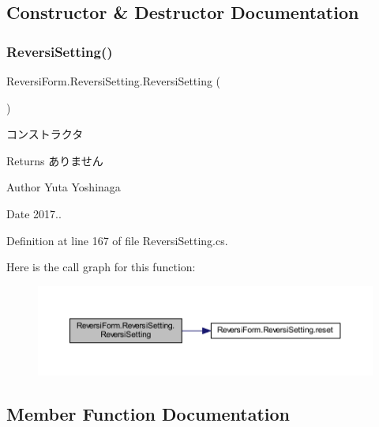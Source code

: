 \subsection{Constructor \& Destructor Documentation}
\mbox{\label{class_reversi_form_1_1_reversi_setting_a985e02a2cbf355f46474efc51a5b3728}} 
\subsubsection{\texorpdfstring{Reversi\+Setting()}{ReversiSetting()}}
{\footnotesize\ttfamily Reversi\+Form.\+Reversi\+Setting.\+Reversi\+Setting (\begin{DoxyParamCaption}{ }\end{DoxyParamCaption})}



コンストラクタ 

\begin{DoxyReturn}{Returns}
ありません 
\end{DoxyReturn}
\begin{DoxyAuthor}{Author}
Yuta Yoshinaga 
\end{DoxyAuthor}
\begin{DoxyDate}{Date}
2017.. 
\end{DoxyDate}


Definition at line 167 of file Reversi\+Setting.\+cs.

Here is the call graph for this function\+:
\nopagebreak
\begin{figure}[H]
\begin{center}
\leavevmode
\includegraphics[width=350pt]{class_reversi_form_1_1_reversi_setting_a985e02a2cbf355f46474efc51a5b3728_cgraph}
\end{center}
\end{figure}


\subsection{Member Function Documentation}
\mbox{\label{class_reversi_form_1_1_reversi_setting_a5ba1f3b862a9938fb89045c3b22dec51}} 
